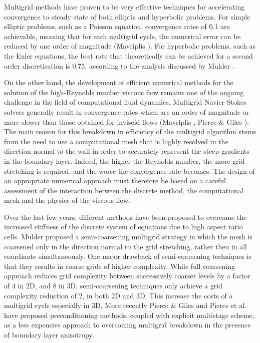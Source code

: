  Multigrid methods have proven to be very effective techniques for accelerating
 convergence to steady state of both elliptic and hyperbolic problems.
 For simple elliptic problems, such as a Poisson equation, convergence rates of
 0.1 are achievable, meaning that for each multigrid cycle, the numerical error
 can be reduced by one order of magnitude (Mavriplis ).
 For hyperbolic problems, such as the Euler equations, the best rate
 that theoretically can be achieved for a second order discretisation is
 0.75, according to the analysis discussed by Mulder \citeyear{Mulder:2}.

 On the other hand, the development of efficient numerical methods for the
 solution of the high-Reynolds number viscous flow remains one of the ongoing
 challenge in the field of computational fluid dynamics. Multigrid Navier-Stokes
 solvers generally result in convergence rates which are an order of magnitude
 or more slower than those obtained for inviscid flows
 (Mavriplis , Pierce \& Giles ).
 The main reason for this breakdown in efficiency
 of the multigrid algorithm stems from the need to use a computational mesh
 that is highly resolved in the direction normal to the wall in order to
 accurately represent the steep gradients in the boundary layer.
 Indeed, the higher the Reynolds number, the more grid stretching is required,
 and the worse the convergence rate becomes. The design of an appropriate
 numerical approach must therefore be based on a careful assessment of the
 interaction between the discrete method, the computational mesh and the physics
 of the viscous flow.

 Over the last few years, different methods have been proposed to overcame
 the increased stiffness of the discrete system of equations due to high
 aspect ratio cells. Mulder \citeyear{Mulder:1} proposed a semi-coarsening
 multigrid strategy in which the mesh is coarsened only in the direction
 normal to the grid stretching, rather then in all coordinate simultaneously.
 One major drawback of semi-coarsening techniques is that they results
 in coarse grids of higher complexity. While full coarsening approach
 reduces grid complexity between successively coarser levels by a factor of 4 in
 2D, and 8 in 3D, semi-coarsening techniques only achieve a grid complexity
 reduction of 2, in both 2D and 3D. This increase the costs of a multigrid
 cycle especially in 3D.
 More recently Pierce \& Giles \citeyear{Giles:10} and
 Pierce et al. \citeyear{Giles:11} have proposed preconditioning
 methods, coupled with explicit multistage scheme, as a less expensive approach
 to overcoming multigrid breakdown in the presence of boundary layer
 anisotropy.

